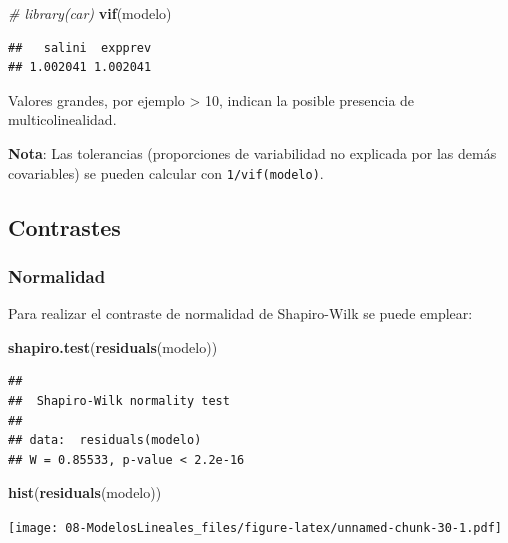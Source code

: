 \documentclass[]{book}
\newenvironment{Shaded}{\begin{snugshade}}{\end{snugshade}}
\newcommand{\CommentTok}[1]{\textcolor[rgb]{0.56,0.35,0.01}{\textit{#1}}}
\newcommand{\KeywordTok}[1]{\textcolor[rgb]{0.13,0.29,0.53}{\textbf{#1}}}
\newcommand{\NormalTok}[1]{#1}
\begin{document}
\begin{Shaded}
\begin{Highlighting}[]
\CommentTok{# library(car)}
\KeywordTok{vif}\NormalTok{(modelo)}
\end{Highlighting}
\end{Shaded}

\begin{verbatim}
##   salini  expprev 
## 1.002041 1.002041
\end{verbatim}

Valores grandes, por ejemplo \textgreater{} 10, indican la posible presencia de multicolinealidad.

\textbf{Nota}: Las tolerancias (proporciones de variabilidad no explicada por las demás covariables) se pueden calcular con \texttt{1/vif(modelo)}.

\hypertarget{contrastes-1}{%
\subsection{Contrastes}\label{contrastes-1}}

\hypertarget{normalidad-1}{%
\subsubsection{Normalidad}\label{normalidad-1}}

Para realizar el contraste de normalidad de Shapiro-Wilk se puede emplear:

\begin{Shaded}
\begin{Highlighting}[]
\KeywordTok{shapiro.test}\NormalTok{(}\KeywordTok{residuals}\NormalTok{(modelo))}
\end{Highlighting}
\end{Shaded}

\begin{verbatim}
## 
##  Shapiro-Wilk normality test
## 
## data:  residuals(modelo)
## W = 0.85533, p-value < 2.2e-16
\end{verbatim}

\begin{Shaded}
\begin{Highlighting}[]
\KeywordTok{hist}\NormalTok{(}\KeywordTok{residuals}\NormalTok{(modelo))}
\end{Highlighting}
\end{Shaded}

\texttt{[image: 08-ModelosLineales\_files/figure-latex/unnamed-chunk-30-1.pdf]}
\end{document}

